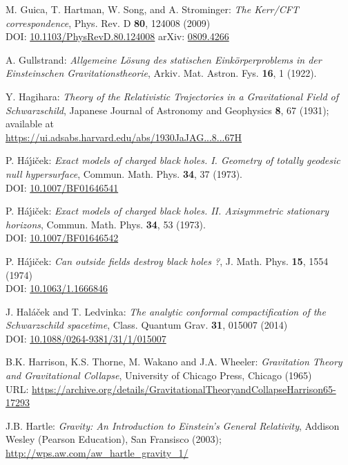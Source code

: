 \begin{thebibliography}{123}
M. Guica, T. Hartman, W. Song, and A. Strominger:
{\em The Kerr/CFT correspondence},
Phys. Rev. D {\bf 80}, 124008 (2009)\\
DOI: \href{https://doi.org/10.1103/PhysRevD.80.124008}{10.1103/PhysRevD.80.124008}\hfill
arXiv: \href{https://arxiv.org/abs/0809.4266}{0809.4266}

A. Gullstrand:
\emph{Allgemeine Lösung des statischen Einkörperproblems in der Einsteinschen Gravitationstheorie},
Arkiv. Mat. Astron. Fys. {\bf 16}, 1 (1922).

Y. Hagihara:
\emph{Theory of the Relativistic Trajectories in a Gravitational Field of Schwarzschild},
Japanese Journal of Astronomy and Geophysics {\bf 8}, 67 (1931);
available at \\
\url{https://ui.adsabs.harvard.edu/abs/1930JaJAG...8...67H}

P. H\'a\'\j i\v{c}ek: {\em Exact models of charged black holes. I. Geometry
of totally geodesic null hypersurface},
Commun. Math. Phys. {\bf 34}, 37 (1973). \\
DOI: \href{https://doi.org/10.1007/BF01646541}{10.1007/BF01646541}

P. H\'a\'\j i\v{c}ek: {\em Exact models of charged black holes.
II. Axisymmetric stationary horizons},
Commun. Math. Phys. {\bf 34}, 53 (1973). \\
DOI: \href{https://doi.org/10.1007/BF01646542}{10.1007/BF01646542}

P. H\'a\'\j i\v{c}ek: {\em Can outside fields destroy black holes ?},
J. Math. Phys. {\bf 15}, 1554 (1974)\\
DOI: \href{https://doi.org/10.1063/1.1666846}{10.1063/1.1666846}

J. Hal\'a\v{c}ek and T. Ledvinka:
{\em The analytic conformal compactification of the Schwarzschild spacetime},
Class. Quantum Grav. {\bf 31}, 015007 (2014)\\
DOI: \href{https://doi.org/10.1088/0264-9381/31/1/015007}{10.1088/0264-9381/31/1/015007}

B.K. Harrison, K.S. Thorne, M. Wakano and J.A. Wheeler:
{\em Gravitation Theory and Gravitational Collapse},
University of Chicago Press, Chicago (1965)\\
URL: {\footnotesize\url{https://archive.org/details/GravitationalTheoryandCollapseHarrison65-17293}}

J.B. Hartle: \emph{Gravity: An Introduction to Einstein's General Relativity},
Addison Wesley (Pearson Education), San Fransisco (2003); \\
\url{http://wps.aw.com/aw_hartle_gravity_1/}


\end{thebibliography}
